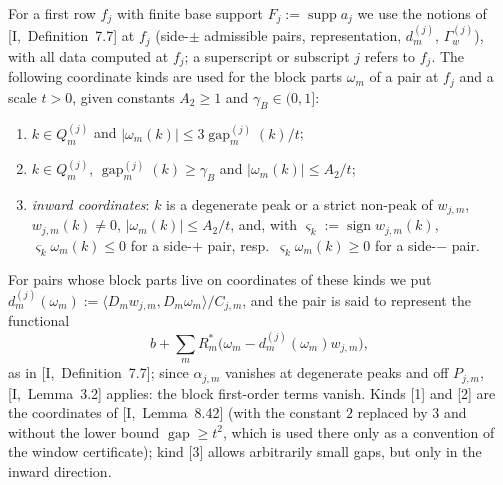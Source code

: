 \documentclass[10pt]{amsart}
\theoremstyle{definition}
\theoremstyle{remark}
\newcommand{\supp}{\operatorname{supp}}
\newcommand{\sgn}{\operatorname{sign}}
\newcommand{\gap}{\operatorname{gap}}
\newcommand{\ip}[2]{\langle #1,#2\rangle}
\begin{document}
For a first row $f_j$ with finite base support $F_j:=\supp a_j$ we use the
notions of [I,~Definition~7.7] at $f_j$ (side-$\pm$ admissible pairs,
representation, $d^{(j)}_m$, $\Gamma^{(j)}_w$), with all data computed at
$f_j$; a superscript or subscript $j$ refers to $f_j$.  The following
coordinate kinds are used for the block parts $\omega_m$ of a pair at $f_j$
and a scale $t>0$, given constants $A_2\ge1$ and $\gamma_B\in(0,1]$:
\begin{enumerate}
\item[{[1]}] $k\in Q^{(j)}_m$ and $|\omega_m(k)|\le3\gap^{(j)}_m(k)/t$;
\item[{[2]}] $k\in Q^{(j)}_m$, $\gap^{(j)}_m(k)\ge\gamma_B$ and
$|\omega_m(k)|\le A_2/t$;
\item[{[3]}] \emph{inward coordinates}: $k$ is a degenerate peak or a strict
non-peak of $w_{j,m}$, $w_{j,m}(k)\ne0$, $|\omega_m(k)|\le A_2/t$, and, with
$\varsigma_k:=\sgn w_{j,m}(k)$, $\varsigma_k\omega_m(k)\le0$ for a
side-$+$ pair, resp.\ $\varsigma_k\omega_m(k)\ge0$ for a side-$-$ pair.
\end{enumerate}
For pairs whose block parts live on coordinates of these kinds we put
$d^{(j)}_m(\omega_m):=\ip{D_mw_{j,m}}{D_m\omega_m}/C_{j,m}$, and the pair
is said to represent the functional
\[
 b+\sum_mR_m^*\big(\omega_m-d^{(j)}_m(\omega_m)w_{j,m}\big),
\]
as in [I,~Definition~7.7]; since $\alpha_{j,m}$ vanishes at degenerate peaks and
off $P_{j,m}$, [I,~Lemma~3.2] applies: the block first-order terms vanish.
Kinds [1] and [2] are the coordinates of [I,~Lemma~8.42] (with the constant
$2$ replaced by $3$ and without the lower bound $\gap\ge t^2$, which is used
there only as a convention of the window certificate); kind [3] allows
arbitrarily small gaps, but only in the inward direction.
\end{document}
